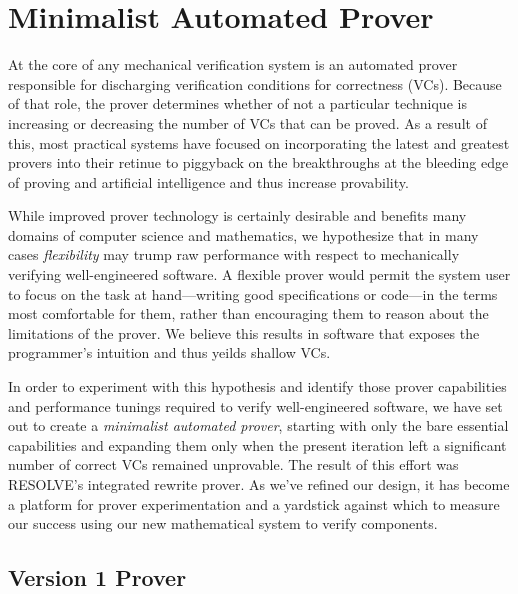 


\chapter{Minimalist Automated Prover\label{ch:prover}}
At the core of any mechanical verification system is an automated prover responsible for discharging verification conditions for correctness (VCs).  Because of that role, the prover determines whether of not a particular technique is increasing or decreasing the number of VCs that can be proved.  As a result of this, most practical systems have focused on incorporating the latest and greatest provers into their retinue to piggyback on the breakthroughs at the bleeding edge of proving and artificial intelligence and thus increase provability.

While improved prover technology is certainly desirable and benefits many domains of computer science and mathematics, we hypothesize that in many cases \emph{flexibility} may trump raw performance with respect to mechanically verifying well-engineered software.  A flexible prover would permit the system user to focus on the task at hand---writing good specifications or code---in the terms most comfortable for them, rather than encouraging them to reason about the limitations of the prover.  We believe this results in software that exposes the programmer's intuition and thus yeilds shallow VCs.

In order to experiment with this hypothesis and identify those prover capabilities and performance tunings required to verify well-engineered software, we have set out to create a \emph{minimalist automated prover}, starting with only the bare essential capabilities and expanding them only when the present iteration left a significant number of correct VCs remained unprovable.  The result of this effort was RESOLVE's integrated rewrite prover.  As we've refined our design, it has become a platform for prover experimentation and a yardstick against which to measure our success using our new mathematical system to verify components.


\section{Version 1 Prover}

